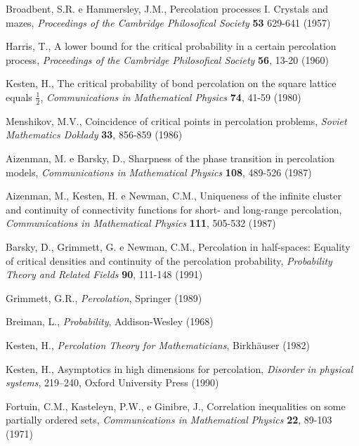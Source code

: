 % 

\pagestyle{myheadings}

\begin{thebibliography}{99}

 Broadbent, S.R. e Hammersley, J.M.,  Percolation processes I.
Crystals and mazes, {\em Proceedings of the Cambridge Philosofical Society}
{\bf 53} 629-641 (1957)
 
 Harris, T., A lower bound for the critical probability in a
  certain percolation process, {\em Proceedings of the Cambridge Philosofical Society}
{\bf 56}, 13-20 (1960)

 Kesten, H., The critical probability of bond percolation on
  the square lattice equals $\frac{1}{2}$, {\em Communications in Mathematical
    Physics} {\bf 74}, 41-59 (1980)

 Menshikov, M.V., Coincidence of critical points in percolation
problems, {\em Soviet Mathematics Doklady} {\bf 33}, 856-859 (1986)

 Aizenman, M. e Barsky, D., Sharpness of the phase transition
  in percolation models, {\em Communications in Mathematical
    Physics} {\bf 108}, 489-526 (1987)

 Aizenman, M., Kesten, H. e Newman, C.M., Uniqueness of the
  infinite cluster and continuity of connectivity functions for short- and
  long-range percolation, {\em Communications in Mathematical
    Physics} {\bf 111}, 505-532 (1987)

 Barsky, D., Grimmett, G. e Newman, C.M.,
Percolation in half-spaces: Equality of critical densities and continuity of
the percolation probability, {\em Probability Theory and Related Fields}
{\bf 90}, 111-148 (1991)

 Grimmett, G.R., {\em Percolation}, Springer (1989)

 Breiman, L., {\em Probability}, Addison-Wesley (1968)

 Kesten, H., {\em Percolation Theory for Mathematicians}, 
                Birkhäuser (1982)

 Kesten, H., Asymptotics in high dimensions for percolation, 
{\em Disorder in physical systems}, 219--240, Oxford University Press (1990) 

 Fortuin, C.M., Kasteleyn, P.W., e Ginibre, J., Correlation
  inequalities on some partially ordered sets, {\em Communications in Mathematical
    Physics} {\bf 22}, 89-103 (1971)


\end{thebibliography}
